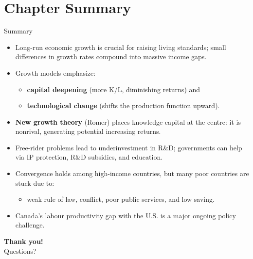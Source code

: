 \documentclass[aspectratio=169]{beamer}
\begin{document}
\section*{Chapter Summary}

\begin{frame}{Summary}
\transfade
\begin{itemize}
  \item Long-run economic growth is crucial for raising living standards; small differences in growth rates compound into massive income gaps.
  \item Growth models emphasize:
  \begin{itemize}
    \item \textbf{capital deepening} (more K/L, diminishing returns) and
    \item \textbf{technological change} (shifts the production function upward).
  \end{itemize}
  \item \textbf{New growth theory} (Romer) places knowledge capital at the centre: it is nonrival, generating potential increasing returns.
  \item Free-rider problems lead to \alert{underinvestment} in R\&D; governments can help via IP protection, R\&D subsidies, and education.
  \item Convergence holds among high-income countries, but many poor countries are stuck due to:
  \begin{itemize}
    \item weak rule of law, conflict, poor public services, and low saving.
  \end{itemize}
  \item Canada's \alert{labour productivity gap} with the U.S. is a major ongoing policy challenge.
\end{itemize}
\end{frame}

\begin{frame}
\centering
\Huge \textbf{Thank you!}\\[1em]
\large Questions?
\end{frame}
\end{document}
